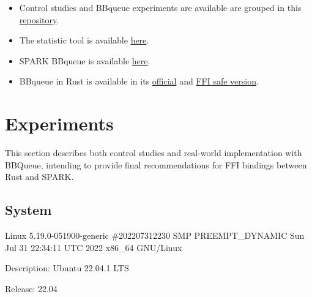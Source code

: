 \documentclass[nomenclature, english, bibtex]{kththesis}
\begin{document}
\begin{itemize}
    \item Control studies and BBqueue experiments are available are grouped in this \href{https://github.com/Dajamante/ada_rust_programs}{repository}.
    \item The statistic tool is available \href{https://github.com/Dajamante/stat_ada_rust_code}{here}.
    \item SPARK BBqueue is available \href{https://github.com/Fabien-Chouteau/bbqueue-spark}{here}.
    \item BBqueue in Rust is available in its \href{https://github.com/jamesmunns/bbqueue}{official} and \href{https://github.com/tosc-rs/mnemos/tree/main/source/abi/src/bbqueue_ipc}{FFI safe version}.
\end{itemize}


\cleardoublepage
\chapter{Experiments}
\label{ch:whatYouDid}



This section describes both control studies and real-world implementation with BBQueue, intending to provide final recommendations for FFI bindings between Rust and SPARK. 


\section{System}






Linux 5.19.0-051900-generic \#202207312230 SMP PREEMPT\_DYNAMIC Sun Jul 31 22:34:11 UTC 2022 x86\_64 GNU/Linux

Description: Ubuntu 22.04.1 LTS

Release:	22.04

\end{document}
